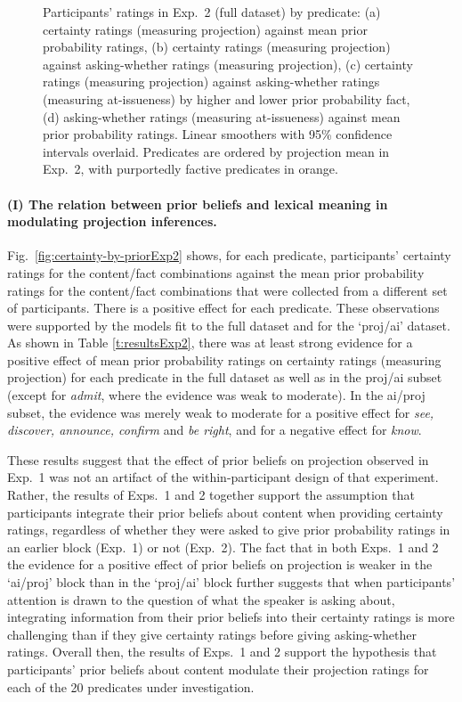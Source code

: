 \documentclass[11pt,fleqn]{article}
\newcommand{\6}{\mbox{$[\hspace*{-.6mm}[$}}
\newcommand{\9}{\mbox{$]\hspace*{-.6mm}]$}}
\begin{document}
\begin{figure}[h!]
\caption{Participants' ratings in Exp.~2 (full dataset) by predicate: (a) certainty ratings (measuring projection) against mean prior probability ratings, (b) certainty ratings (measuring projection) against asking-whether ratings (measuring projection), (c) certainty ratings (measuring projection) against asking-whether ratings (measuring at-issueness) by higher and lower prior probability fact, (d) asking-whether ratings (measuring at-issueness) against mean prior probability ratings. Linear smoothers with 95\% confidence intervals overlaid. Predicates are ordered by projection mean in Exp.~2, with purportedly factive predicates in orange.}\label{fig:results2}
\end{figure}

\paragraph{(I) The relation between prior beliefs and lexical meaning in modulating projection inferences.}  Fig.~\ref{fig:certainty-by-priorExp2} shows, for each predicate, participants' certainty ratings for the content/fact combinations against the mean prior probability ratings for the content/fact combinations that were collected from a different set of participants. There is a positive effect for each predicate. These observations were supported by the models fit to the full dataset and for the `proj/ai' dataset. As shown in Table \ref{t:resultsExp2}, there was at least strong evidence for a positive effect of mean prior probability ratings on certainty ratings (measuring projection) for each predicate in the full dataset as well as in the proj/ai subset (except for {\em admit}, where the evidence was weak to moderate). In the ai/proj subset, the evidence was merely weak to moderate for a positive effect for {\em see, discover, announce, confirm} and {\em be right}, and for a negative effect for {\em know}. 

 These results suggest that the effect of prior beliefs on projection observed in Exp.~1 was not an artifact of the within-participant design of that experiment. Rather, the results of Exps.~1 and 2 together support the assumption that participants integrate their prior beliefs about content when providing certainty ratings, regardless of whether they were asked to give prior probability ratings in an earlier block (Exp.~1) or not (Exp.~2). The fact that in both Exps.~1 and 2 the evidence for a positive effect of prior beliefs on projection is weaker in the `ai/proj' block than in the `proj/ai' block further suggests that when participants' attention is drawn to the question of what the speaker is asking about, integrating information from their prior beliefs into their certainty ratings is more challenging than if they give certainty ratings before giving asking-whether ratings. Overall then, the results of Exps.~1 and 2 support the hypothesis that participants' prior beliefs about content modulate their projection ratings for each of the 20 predicates under investigation.
                          
\end{document}
